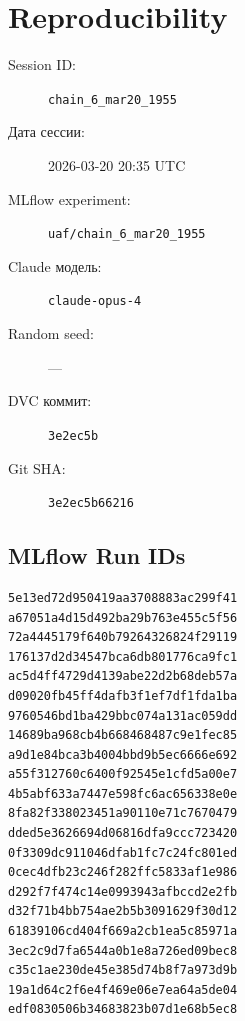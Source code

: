 \documentclass[12pt,a4paper]{article}
\begin{document}
\section{Reproducibility}

\begin{description}
    \item[Session ID:] \texttt{chain\_6\_mar20\_1955}
    \item[Дата сессии:] 2026-03-20 20:35 UTC
    \item[MLflow experiment:] \texttt{uaf/chain\_6\_mar20\_1955}
    \item[Claude модель:] \texttt{claude-opus-4}
    \item[Random seed:] ---
    \item[DVC коммит:] \texttt{3e2ec5b}
    \item[Git SHA:] \texttt{3e2ec5b66216}
\end{description}

\subsection*{MLflow Run IDs}

\begin{lstlisting}
5e13ed72d950419aa3708883ac299f41
a67051a4d15d492ba29b763e455c5f56
72a4445179f640b79264326824f29119
176137d2d34547bca6db801776ca9fc1
ac5d4ff4729d4139abe22d2b68deb57a
d09020fb45ff4dafb3f1ef7df1fda1ba
9760546bd1ba429bbc074a131ac059dd
14689ba968cb4b668468487c9e1fec85
a9d1e84bca3b4004bbd9b5ec6666e692
a55f312760c6400f92545e1cfd5a00e7
4b5abf633a7447e598fc6ac656338e0e
8fa82f338023451a90110e71c7670479
dded5e3626694d06816dfa9ccc723420
0f3309dc911046dfab1fc7c24fc801ed
0cec4dfb23c246f282ffc5833af1e986
d292f7f474c14e0993943afbccd2e2fb
d32f71b4bb754ae2b5b3091629f30d12
61839106cd404f669a2cb1ea5c85971a
3ec2c9d7fa6544a0b1e8a726ed09bec8
c35c1ae230de45e385d74b8f7a973d9b
19a1d64c2f6e4f469e06e7ea64a5de04
edf0830506b34683823b07d1e68b5ec8
\end{lstlisting}
\end{document}
